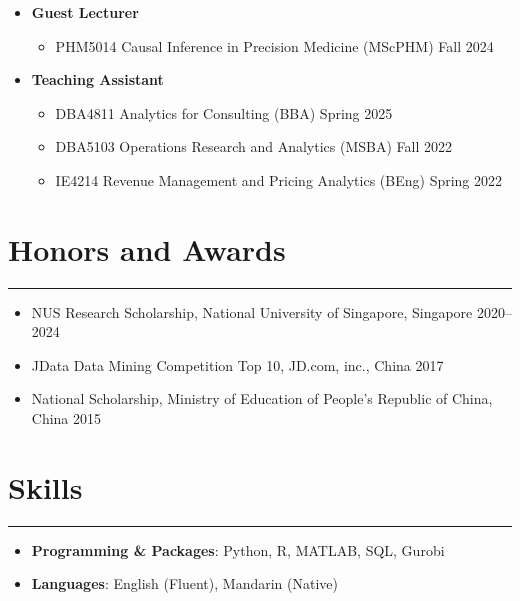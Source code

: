 \documentclass[12pt, a4paper]{article}
\begin{document}
{\begin{itemize}[leftmargin=16pt]
	\item[] \textbf{Guest Lecturer}
	\begin{itemize}[label=$\bullet$]
		\item PHM5014 Causal Inference in Precision Medicine (MScPHM) \hfill Fall 2024
	\end{itemize}

	\item[] \textbf{Teaching Assistant}
	\begin{itemize}[label=$\bullet$]
		\item DBA4811 Analytics for Consulting (BBA) \hfill Spring 2025
		\item DBA5103 Operations Research and Analytics (MSBA) \hfill Fall 2022
		\item IE4214 Revenue Management and Pricing Analytics (BEng) \hfill Spring 2022
	\end{itemize}
\end{itemize}




\section*{Honors and Awards}
\vspace*{4pt}
\hrule

\begin{itemize}[leftmargin=30pt, parsep=0.5pt]
	\item NUS Research Scholarship, National University of Singapore, Singapore \hfill 2020--2024
	\item JData Data Mining Competition Top 10, JD.com, inc., China \hfill 2017
	\item National Scholarship, Ministry of Education of People's Republic of China, China \hfill 2015
\end{itemize}




\section*{Skills}
\vspace*{4pt}
\hrule

\begin{itemize}[leftmargin=16pt]
	\item[] \textbf{Programming \& Packages}: Python, R, MATLAB, SQL, Gurobi
	\item[] \textbf{Languages}: English (Fluent), Mandarin (Native)
\end{itemize}


}

\end{document}
